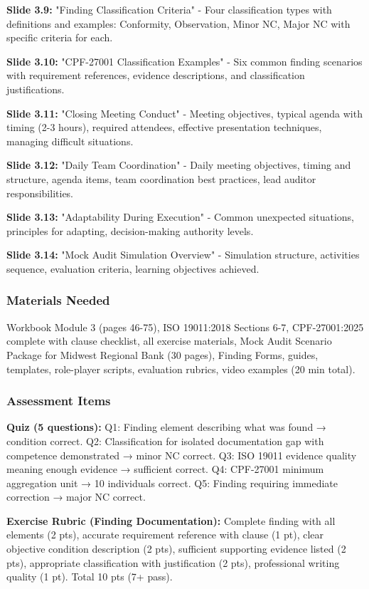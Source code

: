 \documentclass[11pt,a4paper]{article}
\begin{document}
\textbf{Slide 3.9:} "Finding Classification Criteria" - Four classification types with definitions and examples: Conformity, Observation, Minor NC, Major NC with specific criteria for each.

\textbf{Slide 3.10:} "CPF-27001 Classification Examples" - Six common finding scenarios with requirement references, evidence descriptions, and classification justifications.

\textbf{Slide 3.11:} "Closing Meeting Conduct" - Meeting objectives, typical agenda with timing (2-3 hours), required attendees, effective presentation techniques, managing difficult situations.

\textbf{Slide 3.12:} "Daily Team Coordination" - Daily meeting objectives, timing and structure, agenda items, team coordination best practices, lead auditor responsibilities.

\textbf{Slide 3.13:} "Adaptability During Execution" - Common unexpected situations, principles for adapting, decision-making authority levels.

\textbf{Slide 3.14:} "Mock Audit Simulation Overview" - Simulation structure, activities sequence, evaluation criteria, learning objectives achieved.

\subsubsection{Materials Needed}
Workbook Module 3 (pages 46-75), ISO 19011:2018 Sections 6-7, CPF-27001:2025 complete with clause checklist, all exercise materials, Mock Audit Scenario Package for Midwest Regional Bank (30 pages), Finding Forms, guides, templates, role-player scripts, evaluation rubrics, video examples (20 min total).

\subsubsection{Assessment Items}
\textbf{Quiz (5 questions):} Q1: Finding element describing what was found → condition correct. Q2: Classification for isolated documentation gap with competence demonstrated → minor NC correct. Q3: ISO 19011 evidence quality meaning enough evidence → sufficient correct. Q4: CPF-27001 minimum aggregation unit → 10 individuals correct. Q5: Finding requiring immediate correction → major NC correct.

\textbf{Exercise Rubric (Finding Documentation):} Complete finding with all elements (2 pts), accurate requirement reference with clause (1 pt), clear objective condition description (2 pts), sufficient supporting evidence listed (2 pts), appropriate classification with justification (2 pts), professional writing quality (1 pt). Total 10 pts (7+ pass).
\end{document}
